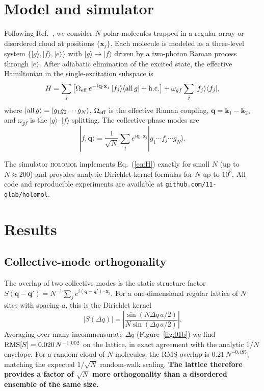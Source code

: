 \documentclass[11pt]{article}
\begin{document}
\section{Model and simulator}
\label{sec:model}

Following Ref.~\cite{tordrup2008}, we consider $N$ polar molecules
trapped in a regular array or disordered cloud at positions
$\{\mathbf x_j\}$. Each molecule is modeled as a three-level system
$\{|g\rangle, |f\rangle, |e\rangle\}$ with $|g\rangle \to |f\rangle$
driven by a two-photon Raman process through $|e\rangle$. After adiabatic
elimination of the excited state, the effective Hamiltonian in the
single-excitation subspace is
\begin{equation}
  H = \sum_j \left[\Omega_{\rm eff}\, e^{-i\mathbf q\cdot\mathbf x_j}\,
       |f_j\rangle\langle {\rm all}\,g| + \mathrm{h.c.}\right]
       + \omega_{gf} \sum_j |f_j\rangle\langle f_j|,
\label{eq:H}
\end{equation}
where $|{\rm all}\,g\rangle = |g_1 g_2 \cdots g_N\rangle$, $\Omega_{\rm
eff}$ is the effective Raman coupling, $\mathbf q = \mathbf k_1 -
\mathbf k_2$, and $\omega_{gf}$ is the $|g\rangle$--$|f\rangle$ splitting.
The collective phase modes are
\begin{equation}
  |f,\mathbf q\rangle = \frac{1}{\sqrt N}\sum_j e^{i\mathbf q\cdot
  \mathbf x_j} |g_1 \cdots f_j \cdots g_N\rangle.
\label{eq:mode}
\end{equation}

The simulator \textsc{holomol} implements Eq.~(\ref{eq:H}) exactly for
small $N$ (up to $N\approx 200$) and provides analytic Dirichlet-kernel
formulas for $N$ up to $10^5$. All code and reproducible experiments are
available at \texttt{github.com/11-qlab/holomol}.

\section{Results}

\subsection{Collective-mode orthogonality}
\label{sec:ortho}

The overlap of two collective modes is the static structure factor
$S(\mathbf q - \mathbf q') = N^{-1}\sum_j e^{i(\mathbf q-\mathbf
q')\cdot\mathbf x_j}$. For a one-dimensional regular lattice of $N$ sites
with spacing $a$, this is the Dirichlet kernel
\begin{equation}
  |S(\Delta q)| = \left|\frac{\sin(N\Delta q\,a/2)}
                        {N\sin(\Delta q\,a/2)}\right|.
\label{eq:dirichlet}
\end{equation}
Averaging over many incommensurate $\Delta q$ (Figure~\ref{fig:01b}) we
find ${\rm RMS}[S] = 0.020\,N^{-1.002}$ on the lattice, in exact
agreement with the analytic $1/N$ envelope. For a random cloud of $N$
molecules, the RMS overlap is $0.21\,N^{-0.485}$, matching the expected
$1/\sqrt N$ random-walk scaling. \textbf{The lattice therefore provides a
factor of $\sqrt N$ more orthogonality than a disordered ensemble of the
same size.}
\end{document}
